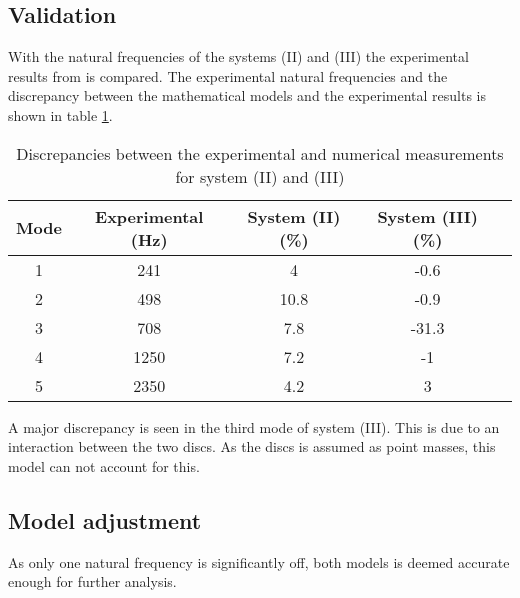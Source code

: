\subsection{Validation}
With the natural frequencies of the systems (II) and (III) the experimental results from \cite[6]{Problem} is compared. The experimental natural frequencies and the discrepancy between the mathematical models and the experimental results is shown in table \ref{tab:validation_two_discs}.
\begin{table}[ht]
    \begin{adjustwidth}{-1cm}{-1cm}
    \centering
    \caption{Discrepancies between the experimental and numerical measurements for system (II) and (III)}
    \label{tab:validation_two_discs}
    \begin{tabular}{@{}ccccc@{}}
        \toprule
        Mode    &   Experimental (\si{\hertz})    &   System (II) (\si{\percent})    &   System (III) (\si{\percent})  \\ \midrule
        1       &   241     &   4       &   -0.6    \\
        2       &   498     &   10.8    &   -0.9    \\
        3       &   708     &   7.8     &   -31.3   \\
        4       &   1250    &   7.2     &   -1      \\ 
        5       &   2350    &   4.2     &   3       \\ \bottomrule
    \end{tabular}
    \end{adjustwidth}
\end{table}

A major discrepancy is seen in the third mode of system (III). This is due to an interaction between the two discs. As the discs is assumed as point masses, this model can not account for this.

\subsection{Model adjustment}
As only one natural frequency is significantly off, both models is deemed accurate enough for further analysis.

